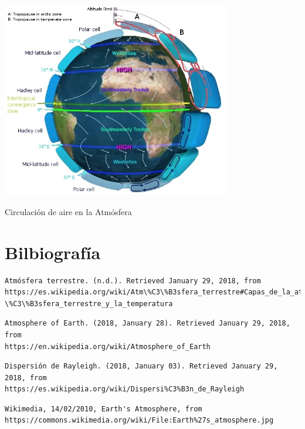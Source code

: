 \documentclass{article}
\begin{document}
\begin{center}
	\includegraphics[width=10cm]{Earth_Global_Circulation.jpg}
    
    Circulación de aire en la Atmósfera
\end{center}

\section{Bilbiografía}

\begin{verbatim}
Atmósfera terrestre. (n.d.). Retrieved January 29, 2018, from
https://es.wikipedia.org/wiki/Atm\%C3\%B3sfera_terrestre#Capas_de_la_atm
\%C3\%B3sfera_terrestre_y_la_temperatura
\end{verbatim}


\begin{verbatim}
Atmosphere of Earth. (2018, January 28). Retrieved January 29, 2018, from 
https://en.wikipedia.org/wiki/Atmosphere_of_Earth
\end{verbatim}


\begin{verbatim}
Dispersión de Rayleigh. (2018, January 03). Retrieved January 29, 2018, from 
https://es.wikipedia.org/wiki/Dispersi%C3%B3n_de_Rayleigh
\end{verbatim}


\begin{verbatim}
Wikimedia, 14/02/2010, Earth's Atmosphere, from
https://commons.wikimedia.org/wiki/File:Earth%27s_atmosphere.jpg
\end{verbatim}
\end{document}
